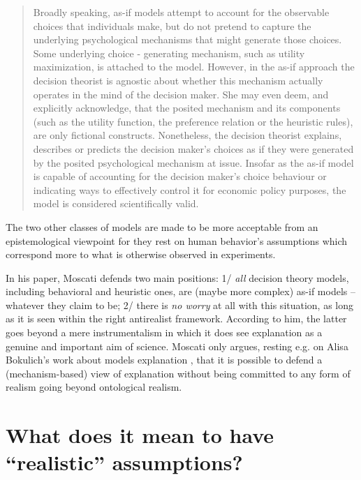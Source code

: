 \documentclass[a4paper,11pt]{article}
\begin{document}
\begin{quote}
Broadly speaking, as-if models attempt to account for the observable choices that
individuals make, but do not pretend to capture the underlying psychological
mechanisms that might generate those choices. Some underlying choice -
generating mechanism, such as utility maximization, is attached to the model.
However, in the as-if approach the decision theorist is agnostic about whether
this mechanism actually operates in the mind of the decision maker. She may
even deem, and explicitly acknowledge, that the posited mechanism and its
components (such as the utility function, the preference relation or the heuristic
rules), are only fictional constructs. Nonetheless, the decision theorist explains,
describes or predicts the decision maker’s choices as if they were generated by
the posited psychological mechanism at issue. Insofar as the as-if model is
capable of accounting for the decision maker’s choice behaviour or indicating ways to effectively control it for economic policy purposes, the model is considered
scientifically valid.
\end{quote}

The two other classes of models are made to be more acceptable from an epistemological viewpoint for they rest on human behavior's assumptions which correspond more to what is otherwise observed in experiments.

In his paper, Moscati defends two main positions: 1/ \textit{all} decision theory models, including behavioral and heuristic ones, are (maybe more complex) as-if models -- whatever they claim to be; 2/ there is \textit{no worry} at all with this situation, as long as it is seen within the right antirealist framework. According to him, the latter goes beyond a mere instrumentalism in which it does see explanation as a genuine and important aim of science. Moscati only argues, resting e.g. on Alisa Bokulich's work about models explanation \citep{Bokulich2009}, that it is possible to defend a (mechanism-based) view of explanation without being committed to any form of realism going beyond ontological realism. 

\section{What does it mean to have ``realistic'' assumptions?}
\end{document}
